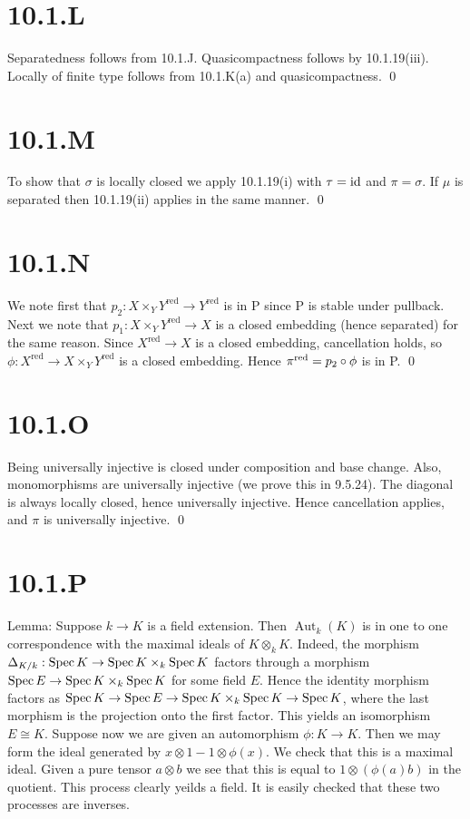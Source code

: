 \documentclass{article}
\begin{document}
\section{10.1.L}
Separatedness follows from 10.1.J. Quasicompactness follows by 10.1.19(iii).
Locally of finite type follows from 10.1.K(a) and quasicompactness. \qed

\section{10.1.M}
To show that $\sigma$ is locally closed we apply 10.1.19(i) with
$\tau=\operatorname{id}$ and $\pi=\sigma$. If $\mu$ is
separated then 10.1.19(ii) applies in the same manner. \qed

\section{10.1.N}
We note first that $p_2: X \times_Y Y^{\text{red}} \to
    Y^{\text{red}}$ is in P since P is stable under
pullback. Next we note that $p_1: X \times_Y Y^{\text{red}} \to X$ is a closed embedding (hence
separated) for the same reason. Since $X^{\text{red}} \to X$ is a closed
embedding, cancellation holds, so $\phi: X^{\text{red}} \to X \times_Y
    Y^{\text{red}}$ is a closed embedding.
Hence $\pi^{\text{red}}=p_2 \circ \phi$ is in P. \qed

\section{10.1.O}
Being universally injective is closed under composition and base change. Also,
monomorphisms are universally injective (we prove this in 9.5.24). The diagonal
is always locally closed, hence universally injective. Hence cancellation
applies, and $\pi$ is universally injective. \qed

\section{10.1.P}
Lemma: Suppose $k \to K$ is a field extension. Then
$\operatorname{Aut}_k(K)$ is in one to one correspondence with the maximal ideals
of $K \otimes_k K$. Indeed, the morphism $\Delta_{K/k}: \operatorname{Spec} K \to \operatorname{Spec} K \times_k \operatorname{Spec} K$ factors
through a morphism $\operatorname{Spec} E \to \operatorname{Spec} K \times_k \operatorname{Spec} K$ for some field
$E$. Hence the identity morphism factors as
$\operatorname{Spec} K \to \operatorname{Spec} E \to \operatorname{Spec} K \times_k \operatorname{Spec} K \to \operatorname{Spec} K$, where the last morphism is the projection onto the
first factor. This yields an isomorphism $E \cong K$. Suppose now we
are given an automorphism $\phi: K \to K$. Then we may form the ideal
generated by $x \otimes 1 - 1 \otimes \phi(x)$. We check that this is a maximal ideal.
Given a pure tensor $a \otimes b$ we see that this is equal to
$1 \otimes (\phi(a)b)$ in the quotient. This process clearly yeilds a field. It
is easily checked that these two processes are inverses.
\end{document}
